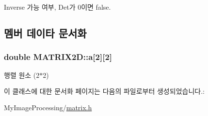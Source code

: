 Inverse 가능 여부, Det가 0이면 false. 



\subsection{멤버 데이타 문서화}
\hypertarget{class_m_a_t_r_i_x2_d_a4ae1e61f3b886f9b3ce346f6d54de973}{
\subsubsection[{a}]{\setlength{\rightskip}{0pt plus 5cm}double M\-A\-T\-R\-I\-X2\-D\-::a\mbox{[}2\mbox{]}\mbox{[}2\mbox{]}\hspace{0.3cm}{\ttfamily [private]}}}\label{class_m_a_t_r_i_x2_d_a4ae1e61f3b886f9b3ce346f6d54de973}


행렬 원소 (2$\ast$2) 



이 클래스에 대한 문서화 페이지는 다음의 파일로부터 생성되었습니다.\-:\begin{DoxyCompactItemize}
\item 
My\-Image\-Processing/\hyperlink{matrix_8h}{matrix.\-h}\end{DoxyCompactItemize}

